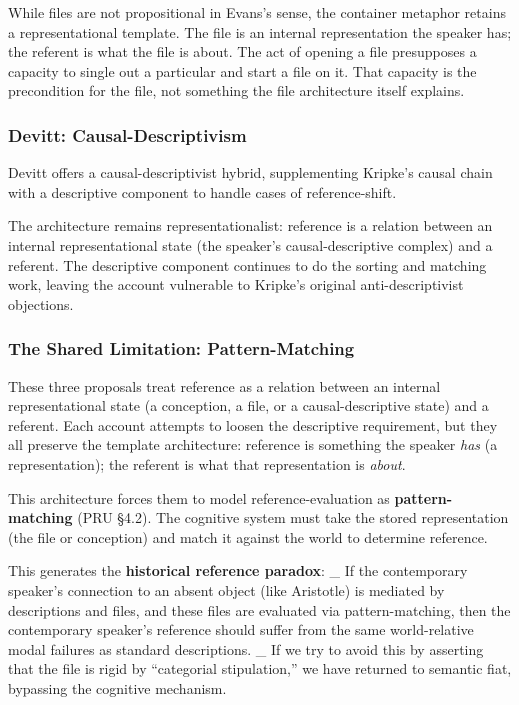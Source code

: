 \documentclass[10pt]{article}
\begin{document}
While files are not propositional in Evans's sense, the container metaphor retains a representational template. The file is an internal representation the speaker has; the referent is what the file is about. The act of opening a file presupposes a capacity to single out a particular and start a file on it. That capacity is the precondition for the file, not something the file architecture itself explains.

\subsubsection{Devitt: Causal-Descriptivism}\label{devitt-causal-descriptivism}

Devitt offers a causal-descriptivist hybrid, supplementing Kripke's causal chain with a descriptive component to handle cases of reference-shift.

The architecture remains representationalist: reference is a relation between an internal representational state (the speaker's causal-descriptive complex) and a referent. The descriptive component continues to do the sorting and matching work, leaving the account vulnerable to Kripke's original anti-descriptivist objections.

\subsubsection{The Shared Limitation: Pattern-Matching}\label{the-shared-limitation-pattern-matching}

These three proposals treat reference as a relation between an internal representational state (a conception, a file, or a causal-descriptive state) and a referent. Each account attempts to loosen the descriptive requirement, but they all preserve the template architecture: reference is something the speaker \emph{has} (a representation); the referent is what that representation is \emph{about}.

This architecture forces them to model reference-evaluation as \textbf{pattern-matching} (PRU §4.2). The cognitive system must take the stored representation (the file or conception) and match it against the world to determine reference.

This generates the \textbf{historical reference paradox}: \_ If the contemporary speaker's connection to an absent object (like Aristotle) is mediated by descriptions and files, and these files are evaluated via pattern-matching, then the contemporary speaker's reference should suffer from the same world-relative modal failures as standard descriptions. \_ If we try to avoid this by asserting that the file is rigid by ``categorial stipulation,'' we have returned to semantic fiat, bypassing the cognitive mechanism.
\end{document}
